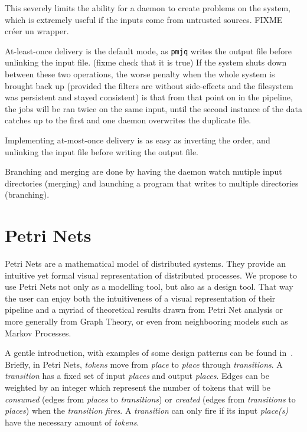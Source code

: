 \documentclass[letterpaper,twocolumn,10pt]{article}
\begin{document}
This severely limits the ability for a daemon to create problems on the system, which is extremely useful if the inputs come from untrusted sources. FIXME créer un wrapper.

At-least-once delivery is the default mode, as {\tt pmjq} writes the output file before unlinking the input file. (fixme check that it is true) If the system shuts down between these two operations, the worse penalty when the whole system is brought back up (provided the filters are without side-effects and the filesystem was persistent and stayed consistent) is that from that point on in the pipeline, the jobs will be ran twice on the same input, until the second instance of the data catches up to the first and one daemon overwrites the duplicate file.

Implementing at-most-once delivery is as easy as inverting the order, and unlinking the input file before writing the output file.

Branching and merging are done by having the daemon watch mutiple input directories (merging) and launching a program that writes to multiple directories (branching).

\section{Petri Nets}

Petri Nets are a mathematical model of distributed systems. They provide an intuitive yet formal visual representation of distributed processes. We propose to use Petri Nets not only as a modelling tool, but also as a design tool. That way the user can enjoy both the intuitiveness of a visual representation of their pipeline and a myriad of theoretical results drawn from Petri Net analysis or more generally from Graph Theory, or even from neighbooring models such as Markov Processes.

A gentle introduction, with examples of some design patterns can be found in~\cite{petrinetsintro}. Briefly, in Petri Nets, \emph{tokens} move from \emph{place} to \emph{place} through \emph{transitions}. A \emph{transition} has a fixed set of input \emph{places} and output \emph{places}. Edges can be weighted by an integer which represent the number of tokens that will be \emph{consumed} (edges from \emph{places} to \emph{transitions}) or \emph{created} (edges from \emph{transitions} to \emph{places}) when the \emph{transition} \emph{fires}. A \emph{transition} can only fire if its input \emph{place(s)} have the necessary amount of \emph{tokens}.
\end{document}
